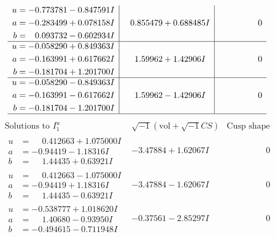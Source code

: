 \documentclass[1p]{elsarticle_modified}
\theoremstyle{definition}
\newcommand{\I}{\sqrt{-1}}
\begin{document}
$$\begin{array}{c|c|c}
\begin{aligned}
u &= -0.773781 - 0.847591 I \\
a &= -0.283499 + 0.078158 I \\
b &= \phantom{-}0.093732 - 0.602934 I\end{aligned}
 & \phantom{-}0.855479 + 0.688485 I & \phantom{-0.000000 } 0 \\ \hline\begin{aligned}
u &= -0.058290 + 0.849363 I \\
a &= -0.163991 + 0.617662 I \\
b &= -0.181704 + 1.201700 I\end{aligned}
 & \phantom{-}1.59962 + 1.42906 I & \phantom{-0.000000 } 0 \\ \hline\begin{aligned}
u &= -0.058290 - 0.849363 I \\
a &= -0.163991 - 0.617662 I \\
b &= -0.181704 - 1.201700 I\end{aligned}
 & \phantom{-}1.59962 - 1.42906 I & \phantom{-0.000000 } 0\\
 \hline 
 \end{array}$$\newpage$$\begin{array}{c|c|c}  
\text{Solutions to }I^u_{1}& \I (\text{vol} + \sqrt{-1}CS) & \text{Cusp shape}\\
 \hline 
\begin{aligned}
u &= \phantom{-}0.412663 + 1.075000 I \\
a &= -0.94419 - 1.18316 I \\
b &= \phantom{-}1.44435 + 0.63921 I\end{aligned}
 & -3.47884 + 1.62067 I & \phantom{-0.000000 } 0 \\ \hline\begin{aligned}
u &= \phantom{-}0.412663 - 1.075000 I \\
a &= -0.94419 + 1.18316 I \\
b &= \phantom{-}1.44435 - 0.63921 I\end{aligned}
 & -3.47884 - 1.62067 I & \phantom{-0.000000 } 0 \\ \hline\begin{aligned}
u &= -0.538777 + 1.018620 I \\
a &= \phantom{-}1.40680 - 0.93950 I \\
b &= -0.494615 - 0.711948 I\end{aligned}
 & -0.37561 - 2.85297 I & \phantom{-0.000000 } 0 \\ \hline\begin{aligned}

\end{aligned}
\end{array}$$
\end{document}
